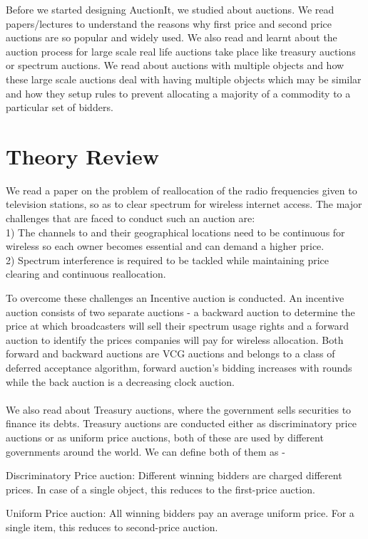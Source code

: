 \documentclass[a4paper]{article}
\begin{document}
Before we started designing AuctionIt, we studied about auctions. We read papers/lectures to understand the reasons why first price and second price auctions are so popular and widely used. We also read and learnt about the auction process for large scale real life auctions take place like treasury auctions or spectrum auctions. We read about auctions with multiple objects and how these large scale auctions deal with having multiple objects which may be similar and how they setup rules to prevent allocating a majority of a commodity to a particular set of bidders.
\section*{Theory Review}
We read a paper on the problem of reallocation of the radio frequencies given to television stations, so as to clear spectrum for wireless internet access. The major challenges that are faced to conduct such an auction are:\\
1) The channels to and their geographical locations need to be continuous for wireless so each owner becomes essential and can demand a higher price.\\
2) Spectrum interference is required to be tackled while maintaining price clearing and continuous reallocation.

To overcome these challenges an Incentive auction is conducted. An incentive auction consists of two separate auctions - a backward auction to determine the price at which broadcasters will sell their spectrum usage rights and a forward auction to identify the prices companies will pay for wireless allocation. Both forward and backward auctions are VCG auctions and belongs to a class of deferred acceptance algorithm, forward auction's bidding increases with rounds while the back auction is a decreasing clock auction.
\\\\
We also read about Treasury auctions, where the government sells securities to finance its debts. Treasury auctions are conducted either as discriminatory price auctions or as uniform price auctions, both of these are used by different governments around the world. We can define both of them as - 

Discriminatory Price auction: Different winning bidders are charged different prices. In case of a single object, this reduces to the first-price auction.

Uniform Price auction: All winning bidders pay an average uniform price. For a single item, this reduces to second-price auction.
\end{document}
